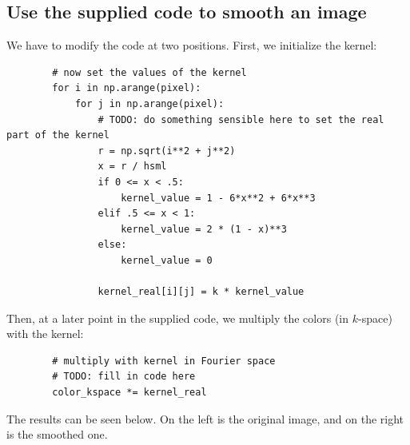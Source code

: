 \newpage
\subsection{Use the supplied code to smooth an image}
    We have to modify the code at two positions.
    First, we initialize the kernel:
    \begin{lstlisting}
        # now set the values of the kernel
        for i in np.arange(pixel):
            for j in np.arange(pixel):
                # TODO: do something sensible here to set the real part of the kernel
                r = np.sqrt(i**2 + j**2)
                x = r / hsml
                if 0 <= x < .5:
                    kernel_value = 1 - 6*x**2 + 6*x**3
                elif .5 <= x < 1:
                    kernel_value = 2 * (1 - x)**3
                else:
                    kernel_value = 0
        
                kernel_real[i][j] = k * kernel_value\end{lstlisting}
    Then, at a later point in the supplied code, 
    we multiply the colors (in $k$-space) with the kernel:
    \begin{lstlisting}
        # multiply with kernel in Fourier space
        # TODO: fill in code here
        color_kspace *= kernel_real\end{lstlisting}
    The results can be seen below. On the left is the original image, 
    and on the right is the smoothed one.
